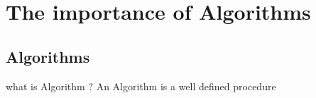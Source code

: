 \chapter{The importance of Algorithms}
\section{Algorithms}
what is Algorithm ? 
\newline
An Algorithm is a well defined procedure
